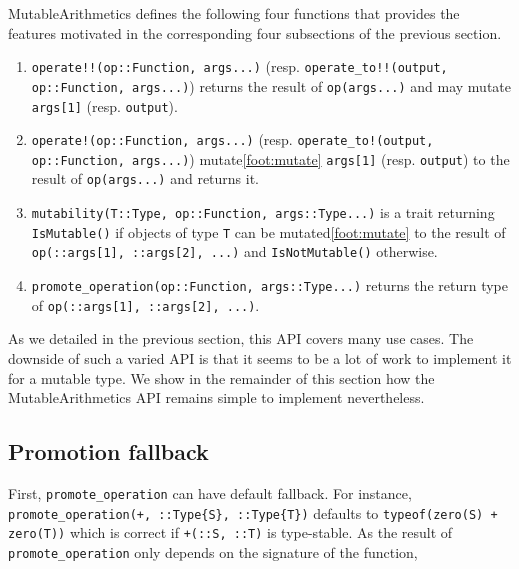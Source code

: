 \documentclass{juliacon}
\newcommand{\ma}{MutableArithmetics}
\begin{document}
\ma{} defines the following four functions that provides the features motivated in the corresponding four subsections of the previous section.
\begin{enumerate}
  \item \lstinline|operate!!(op::Function, args...)| (resp. \lstinline|operate_to!!(output, op::Function, args...)|) returns the result of \lstinline|op(args...)| and may mutate \lstinline|args[1]| (resp. \lstinline|output|).
  \item \lstinline|operate!(op::Function, args...)| (resp. \lstinline|operate_to!(output, op::Function, args...)|) mutate\cref{foot:mutate} \lstinline|args[1]| (resp. \lstinline|output|) to the result of \lstinline|op(args...)| and returns it.
  \item \lstinline|mutability(T::Type, op::Function, args::Type...)| is a trait returning \lstinline|IsMutable()| if objects of type \lstinline|T| can be mutated\cref{foot:mutate} to the result of \lstinline|op(::args[1], ::args[2], ...)| and \lstinline|IsNotMutable()| otherwise.
  \item \lstinline|promote_operation(op::Function, args::Type...)| returns the return type of \lstinline|op(::args[1], ::args[2], ...)|.
\end{enumerate}

As we detailed in the previous section, this API covers many use cases.
The downside of such a varied API is that it seems to be a lot of work to implement it for a mutable type.
We show in the remainder of this section how the \ma{} API remains simple to implement nevertheless.

\subsection{Promotion fallback}
First, \lstinline|promote_operation| can have default fallback.
For instance, \lstinline|promote_operation(+, ::Type{S}, ::Type{T})|
defaults to \lstinline|typeof(zero(S) + zero(T))| which is correct if \lstinline|+(::S, ::T)| is type-stable.
As the result of \lstinline|promote_operation| only depends on the signature of the function,
\end{document}
